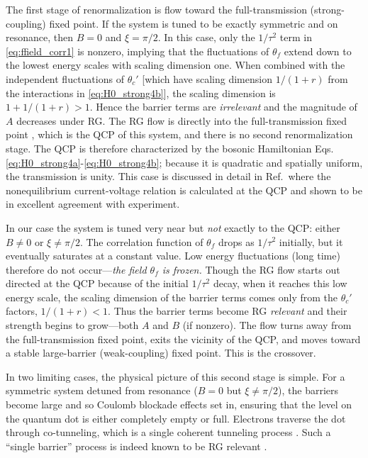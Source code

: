 \documentclass[aps,prb,reprint,floatfix,superscriptaddress,amssymb,amsmath]{revtex4-2}
\begin{document}
The first stage of renormalization is flow toward the full-transmission (strong-coupling) fixed point. If the system is tuned to be exactly symmetric and on resonance, then $B\!=\!0$ and $\xi\!=\!\pi/2$. In this case, only the $1/\tau^2$ term in \eqref{eq:ffield_corr1} is nonzero, implying that the fluctuations of $\theta_f$ extend down to the lowest energy scales with scaling dimension one. When combined with the independent fluctuations of $\theta_c'$ [which have scaling dimension $1/(1+r)$ from the interactions in \eqref{eq:H0_strong4b}], the scaling dimension is $1 + 1/(1+r) \!>\! 1$. Hence the barrier terms are \emph{irrelevant} and the magnitude of $A$ decreases under RG. The RG flow is directly into the full-transmission fixed point \cite{ImpurityEntropy}, 
which is the QCP of this system, and there is no second renormalization stage. The QCP is therefore characterized by the bosonic Hamiltonian Eqs.\,\eqref{eq:H0_strong4a}-\eqref{eq:H0_strong4b}; because it is quadratic and spatially uniform, the transmission is unity. This case is discussed in detail in Ref.\,\cite{ZhangNoneqPRR21} where the nonequilibrium current-voltage relation is calculated at the QCP and shown to be in excellent agreement with experiment. 

In our case the system is tuned very near but \emph{not} exactly to the QCP: either $B \!\neq\!0$ or $\xi\!\neq\!\pi/2$. The correlation function of $\theta_f$ drops as  $1/\tau^2$ initially, but it eventually saturates at a constant value. Low energy fluctuations (long time) therefore do not occur---\emph{the field $\theta_f$ is frozen.} Though the RG flow starts out directed at the QCP because of the initial $1/\tau^2$ decay, when it reaches this low energy scale, the scaling dimension of the barrier terms comes only from the $\theta_c'$ factors, $1/(1+r) \!<\! 1$. Thus the barrier terms become RG \emph{relevant} and their strength begins to grow---both $A$ and $B$ (if nonzero). The flow turns away from the full-transmission fixed point, exits the vicinity of the QCP, and moves toward a stable large-barrier (weak-coupling) fixed point. This is the crossover.  

 In two limiting cases, the physical picture of this second stage is simple. For a symmetric system detuned from resonance ($B\!=\!0$ but $\xi\!\neq\!\pi/2$), the barriers become large and so Coulomb blockade effects set in, ensuring that the level on the quantum dot is either completely empty or full. Electrons traverse the dot through co-tunneling, which is a single coherent tunneling process \cite{GoldsteinPRB10, LiuRLdissipPRB14}. Such a ``single barrier'' process is indeed known to be RG relevant \cite{GiamarchiBook,GogolinBook}. 
\end{document}
